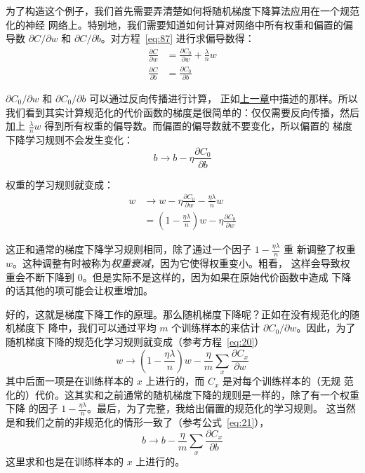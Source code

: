 为了构造这个例子，我们首先需要弄清楚如何将随机梯度下降算法应用在一个规范化的神经
网络上。特别地，我们需要知道如何计算对网络中所有权重和偏置的偏导数 $\partial
C/\partial w$ 和 $\partial C/\partial b$。对方程~\eqref{eq:87} 进行求偏导数得：
\begin{align}
  \frac{\partial C}{\partial w} & = \frac{\partial C_0}{\partial w} +
                                  \frac{\lambda}{n} w \label{eq:88}\tag{88} \\
  \frac{\partial C}{\partial b} & = \frac{\partial C_0}{\partial b} \label{eq:89}\tag{89}
\end{align}

$\partial C_0/\partial w$ 和 $\partial C_0/\partial b$ 可以通过反向传播进行计算，
正如\hyperref[ch:HowTheBackpropagationAlgorithmWorks]{上一章}中描述的那样。所以
我们看到其实计算规范化的代价函数的梯度是很简单的：仅仅需要反向传播，然后加上
$\frac{\lambda}{n} w$ 得到所有权重的偏导数。而偏置的偏导数就不要变化，所以偏置的
梯度下降学习规则不会发生变化：
\begin{equation}
  b \rightarrow b -\eta \frac{\partial C_0}{\partial b}
  \label{eq:90}\tag{90}
\end{equation}

权重的学习规则就变成：
\begin{align}
  w & \rightarrow w-\eta \frac{\partial C_0}{\partial
      w}-\frac{\eta \lambda}{n} w \label{eq:91}\tag{91}\\
    & = \left(1-\frac{\eta \lambda}{n}\right) w -\eta \frac{\partial
      C_0}{\partial w} \label{eq:92}\tag{92}
\end{align}

这正和通常的梯度下降学习规则相同，除了通过一个因子 $1-\frac{\eta\lambda}{n}$ 重
新调整了权重 $w$。这种调整有时被称为\emph{权重衰减}，因为它使得权重变小。粗看，
这样会导致权重会不断下降到 $0$。但是实际不是这样的，因为如果在原始代价函数中造成
下降的话其他的项可能会让权重增加。

好的，这就是梯度下降工作的原理。那么随机梯度下降呢？正如在没有规范化的随机梯度下
降中，我们可以通过平均 $m$ 个训练样本的\minibatch{}来估计 $\partial C_0/\partial
w$。因此，为了随机梯度下降的规范化学习规则就变成（参考方程~\eqref{eq:20}）
\begin{equation}
  w \rightarrow \left(1-\frac{\eta \lambda}{n}\right) w -\frac{\eta}{m}
  \sum_x \frac{\partial C_x}{\partial w}
  \label{eq:93}\tag{93}
\end{equation}
其中后面一项是在训练样本的\minibatch{} $x$ 上进行的，而 $C_x$ 是对每个训练样本的（无规
  范化的）代价。这其实和之前通常的随机梯度下降的规则是一样的，除了有一个权重下降
的因子 $1-\frac{\eta \lambda}{n}$。最后，为了完整，我给出偏置的规范化的学习规则。
这当然是和我们之前的非规范化的情形一致了（参考公式~\eqref{eq:21}），
\begin{equation}
  b \rightarrow b - \frac{\eta}{m} \sum_x \frac{\partial C_x}{\partial b}
  \label{eq:94}\tag{94}
\end{equation}
这里求和也是在训练样本的\minibatch{} $x$ 上进行的。

